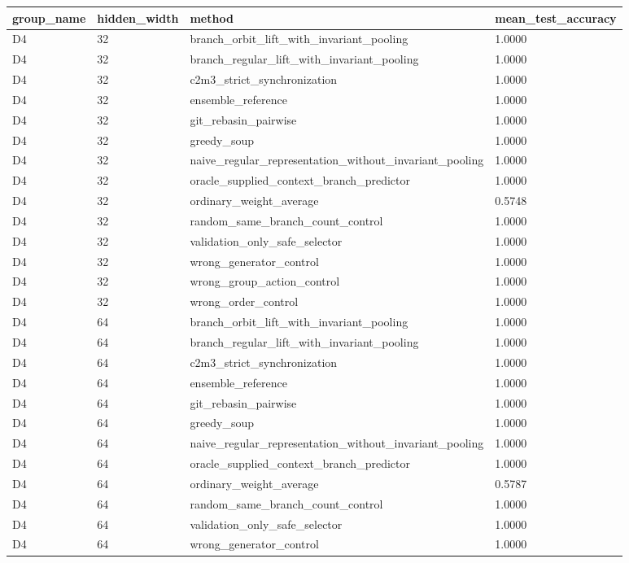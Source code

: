 \begin{tabular}{llll}
\toprule
group_name & hidden_width & method & mean_test_accuracy\\
\midrule
D4 & 32 & branch\_orbit\_lift\_with\_invariant\_pooling & 1.0000\\
D4 & 32 & branch\_regular\_lift\_with\_invariant\_pooling & 1.0000\\
D4 & 32 & c2m3\_strict\_synchronization & 1.0000\\
D4 & 32 & ensemble\_reference & 1.0000\\
D4 & 32 & git\_rebasin\_pairwise & 1.0000\\
D4 & 32 & greedy\_soup & 1.0000\\
D4 & 32 & naive\_regular\_representation\_without\_invariant\_pooling & 1.0000\\
D4 & 32 & oracle\_supplied\_context\_branch\_predictor & 1.0000\\
D4 & 32 & ordinary\_weight\_average & 0.5748\\
D4 & 32 & random\_same\_branch\_count\_control & 1.0000\\
D4 & 32 & validation\_only\_safe\_selector & 1.0000\\
D4 & 32 & wrong\_generator\_control & 1.0000\\
D4 & 32 & wrong\_group\_action\_control & 1.0000\\
D4 & 32 & wrong\_order\_control & 1.0000\\
D4 & 64 & branch\_orbit\_lift\_with\_invariant\_pooling & 1.0000\\
D4 & 64 & branch\_regular\_lift\_with\_invariant\_pooling & 1.0000\\
D4 & 64 & c2m3\_strict\_synchronization & 1.0000\\
D4 & 64 & ensemble\_reference & 1.0000\\
D4 & 64 & git\_rebasin\_pairwise & 1.0000\\
D4 & 64 & greedy\_soup & 1.0000\\
D4 & 64 & naive\_regular\_representation\_without\_invariant\_pooling & 1.0000\\
D4 & 64 & oracle\_supplied\_context\_branch\_predictor & 1.0000\\
D4 & 64 & ordinary\_weight\_average & 0.5787\\
D4 & 64 & random\_same\_branch\_count\_control & 1.0000\\
D4 & 64 & validation\_only\_safe\_selector & 1.0000\\
D4 & 64 & wrong\_generator\_control & 1.0000\\

\end{tabular}
